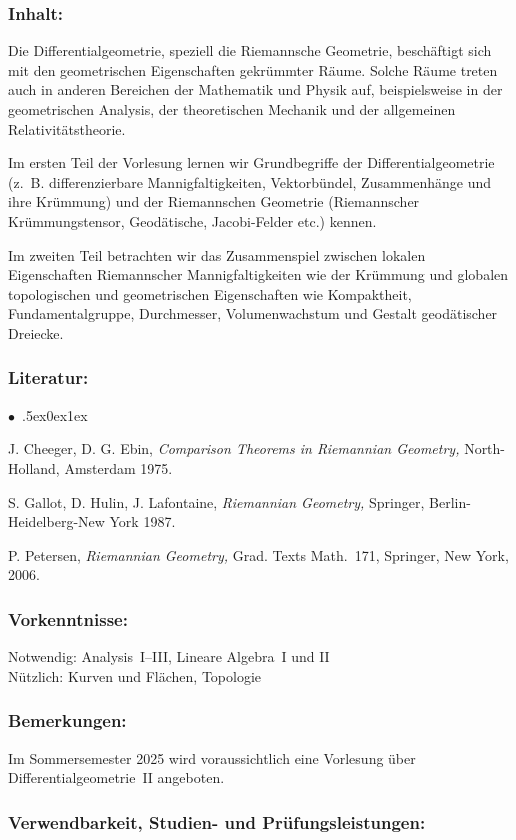 \documentclass[a4paper,10pt]{article}
\renewenvironment{itemize}{\begin{list}{$\bullet$\ }{\itemsep.5ex\setlength{\topsep}{0.5\itemsep}\parsep0ex\labelsep1ex\settowidth{\labelwidth}{$\bullet$\ }\setlength{\leftmargin}{\labelwidth}\addtolength{\leftmargin}{3ex}\addtolength{\leftmargin}{\labelsep}}}{\end{list}}
\begin{document}
\subsubsection*{\large
    Inhalt:
}
Die Differentialgeometrie, speziell die Riemannsche Geometrie, besch\"aftigt sich mit den geometrischen Eigenschaften gekr\"ummter R\"aume.
Solche R\"aume treten auch in anderen Bereichen der Mathematik und Physik auf, beispielsweise in der geometrischen Analysis, der theoretischen Mechanik
und der allgemeinen Relativit\"atstheorie.

Im ersten Teil der Vorlesung lernen wir Grundbegriffe der Differentialgeometrie (z.\ B. differenzierbare Mannigfaltigkeiten, Vektorb\"undel, Zusammenh\"ange und ihre Kr\"ummung) und der Riemannschen Geometrie (Riemannscher Kr\"ummungstensor, Geod\"atische, Jacobi-Felder etc.) kennen.

Im zweiten Teil betrachten wir das Zusammenspiel zwischen lokalen Eigenschaften Riemannscher Mannigfaltigkeiten wie der Kr\"ummung und globalen topologischen und geometrischen Eigenschaften wie Kompaktheit, Fundamentalgruppe, Durchmesser, Volumenwachstum und Gestalt geod\"atischer Dreiecke.
\subsubsection*{\large
    Literatur:
}
\begin{itemize}
\item{J. Cheeger, D. G. Ebin, {\em Comparison Theorems in Riemannian Geometry,\/} North-Holland, Amsterdam 1975.}
\item{S. Gallot, D. Hulin, J. Lafontaine, {\em Riemannian Geometry,\/} Springer, Berlin-Heidelberg-New York 1987.}
\item{P. Petersen, {\em Riemannian Geometry,\/} Grad. Texts Math.~171, Springer, New York, 2006.}
\end{itemize}
\subsubsection*{\large
    Vorkenntnisse:
}
Notwendig: Analysis~I–III, Lineare Algebra~I und II \\
Nützlich: Kurven und Flächen, Topologie
\subsubsection*{\large
    Bemerkungen:
}
Im Sommersemester 2025 wird voraussichtlich eine Vorlesung über Differentialgeometrie~II angeboten. 
\subsubsection*{\large
    Verwendbarkeit, Studien- und Prüfungsleistungen:
}
\end{document}
